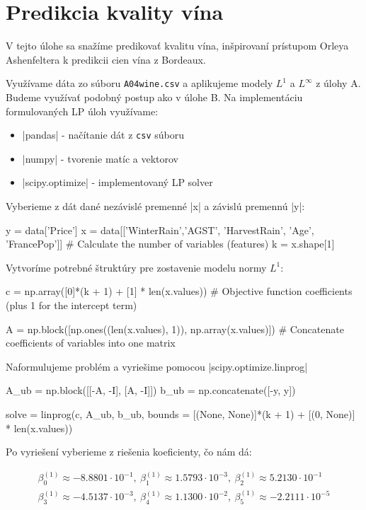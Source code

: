 \documentclass[report.tex]{subfiles}
\begin{document}
   

\section{Predikcia kvality vína}\label{sec:C}
V tejto úlohe sa snažíme predikovať kvalitu vína, inšpirovaní prístupom Orleya Ashenfeltera k predikcii cien vína z Bordeaux.

Využívame dáta zo súboru \verb|A04wine.csv| a aplikujeme modely $L^1$ a $L^{\infty}$ z úlohy A. Budeme využívať podobný postup ako v úlohe B. Na implementáciu formulovaných LP úloh využívame:
\begin{itemize}
	\item \pyth|pandas| - načítanie dát z \verb|csv| súboru
	\item \pyth|numpy| - tvorenie matíc a vektorov
	\item \pyth|scipy.optimize| - implementovaný LP solver
\end{itemize}

Vyberieme z dát dané nezávislé premenné \pyth|x| a závislú premennú \pyth|y|:

\begin{python}
y = data['Price']
x = data[['WinterRain','AGST', 'HarvestRain', 'Age', 'FrancePop']]
# Calculate the number of variables (features)
k = x.shape[1]
\end{python}

Vytvoríme potrebné štruktúry pre zostavenie modelu normy $L^1$:

\begin{python}
c = np.array([0]*(k + 1) + [1] * len(x.values)) # Objective function coefficients (plus 1 for the intercept term)

A = np.block([np.ones((len(x.values), 1)), np.array(x.values)]) # Concatenate coefficients of variables into one matrix
\end{python}

Naformulujeme problém a vyriešime pomocou \pyth|scipy.optimize.linprog|

\begin{python}
A_ub = np.block([[-A, -I], [A, -I]])
b_ub = np.concatenate([-y, y])

solve = linprog(c, A_ub, b_ub, bounds = [(None, None)]*(k + 1) + [(0, None)] * len(x.values))
\end{python}

Po vyriešení vyberieme z riešenia koeficienty, čo nám dá: 

\begin{gather*}
	\beta_0^{(1)} \approx -8.8801 \cdot 10^{-1} ,~\beta_1^{(1)} \approx 1.5793\cdot 10^{-3},~\beta_2^{(1)} \approx 5.2130\cdot 10^{-1} \\
	\beta_3^{(1)} \approx -4.5137\cdot 10^{-3} ,~\beta_4^{(1)} \approx 1.1300\cdot 10^{-2}  ,~\beta_5^{(1)} \approx -2.2111\cdot 10^{-5}
\end{gather*}
\end{document}
